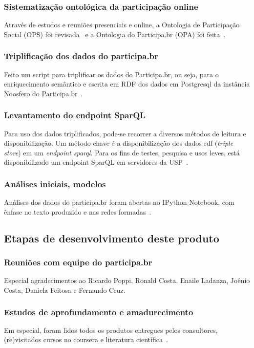 \documentclass[12pt]{article}
\begin{document}
\subsubsection{Sistematização ontológica da participação online}
Através de estudos e reuniões presenciais e online, a Ontologia de Participação Social (OPS) foi revisada~\cite{OPS} e a Ontologia do Participa.br (OPA) foi feita~\cite{OPA}.
\subsubsection{Triplificação dos dados do participa.br}
Feito um script para triplificar os dados do Participa.br, ou seja, para o enriquecimento semântico e escrita em RDF dos dados em Postgresql da instância Noosfero do Participa.br~\cite{triplifica}.
\subsubsection{Levantamento do endpoint SparQL}\label{sec:sfoo}
Para uso dos dados triplificados, pode-se recorrer a diversos métodos de leitura e disponibilização. Um método-chave é a disponibilização dos dados rdf (\emph{triple store}) em um \emph{endpoint sparql}. Para os fins de testes, pesquisa e usos leves, está disponibilizado um endpoint SparQL em servidores da USP~\cite{endpoint}.
\subsubsection{Análises iniciais, modelos}
Análises dos dados do participa.br foram abertas no IPython Notebook, com ênfase no texto produzido e nas redes formadas~\cite{repoProd3}.
\subsection{Etapas de desenvolvimento deste produto}
\subsubsection{Reuniões com equipe do participa.br}
Especial agradecimentos ao Ricardo Poppi, Ronald Costa, Enaile Ladanza, Joênio Costa, Daniela Feitosa e Fernando Cruz.
\subsubsection{Estudos de aprofundamento e amadurecimento}
Em especial, foram lidos todos os produtos entregues pelos consultores, (re)visitados cursos no coursera e literatura científica~\cite{prodExtra}.
\end{document}
